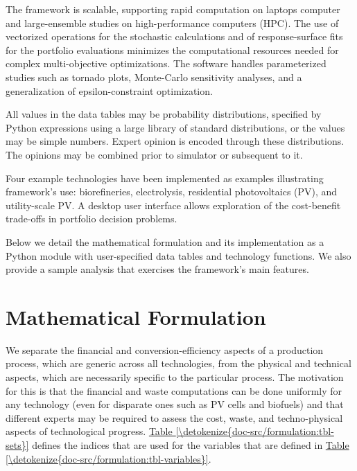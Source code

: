 \documentclass[letterpaper,10pt,english]{sphinxmanual}
\begin{document}
The framework is scalable, supporting rapid computation on laptops
computer and large-ensemble studies on high-performance computers (HPC).
The use of vectorized operations for the stochastic calculations and of
response-surface fits for the portfolio evaluations minimizes the
computational resources needed for complex multi-objective
optimizations. The software handles parameterized studies such as
tornado plots, Monte-Carlo sensitivity analyses, and a generalization of
epsilon-constraint optimization.

All values in the data tables may be probability distributions,
specified by Python expressions using a large library of standard
distributions, or the values may be simple numbers. Expert opinion is
encoded through these distributions. The opinions may be combined prior
to simulator or subsequent to it.

Four example technologies have been implemented as examples illustrating
framework’s use: biorefineries, electrolysis, residential photovoltaics
(PV), and utility-scale PV. A desktop user interface allows exploration
of the cost-benefit trade-offs in portfolio decision problems.

Below we detail the mathematical formulation and its implementation as a
Python module with user-specified data tables and technology functions.
We also provide a sample analysis that exercises the framework’s main
features.


\chapter{Mathematical Formulation}
\label{\detokenize{doc-src/formulation:mathematical-formulation}}\label{\detokenize{doc-src/formulation::doc}}
We separate the financial and conversion-efficiency aspects of a
production process, which are generic across all technologies, from the
physical and technical aspects, which are necessarily specific to the
particular process. The motivation for this is that the financial and
waste computations can be done uniformly for any technology (even for
disparate ones such as PV cells and biofuels) and that different experts
may be required to assess the cost, waste, and techno-physical aspects
of technological progress. \hyperref[\detokenize{doc-src/formulation:tbl-sets}]{Table \ref{\detokenize{doc-src/formulation:tbl-sets}}} defines the indices that are used
for the variables that are defined in \hyperref[\detokenize{doc-src/formulation:tbl-variables}]{Table \ref{\detokenize{doc-src/formulation:tbl-variables}}}.
\end{document}
